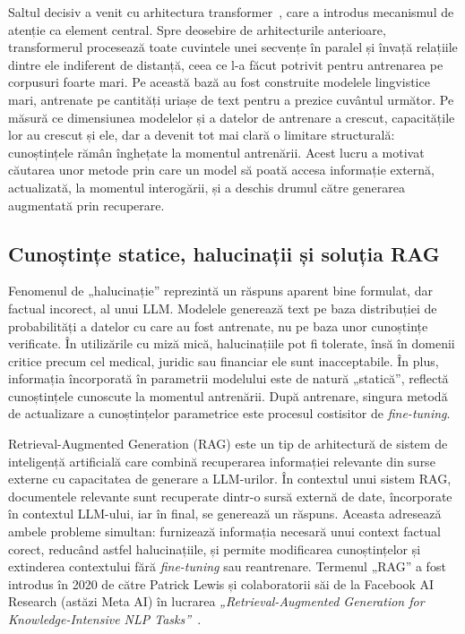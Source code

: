 Saltul decisiv a venit cu arhitectura transformer~\cite{vaswani2017attention}, care a introdus mecanismul de atenție ca element central. Spre deosebire de arhitecturile anterioare, transformerul procesează toate cuvintele unei secvențe în paralel și învață relațiile dintre ele indiferent de distanță, ceea ce l-a făcut potrivit pentru antrenarea pe corpusuri foarte mari. Pe această bază au fost construite modelele lingvistice mari, antrenate pe cantități uriașe de text pentru a prezice cuvântul următor. Pe măsură ce dimensiunea modelelor și a datelor de antrenare a crescut, capacitățile lor au crescut și ele, dar a devenit tot mai clară o limitare structurală: cunoștințele rămân înghețate la momentul antrenării. Acest lucru a motivat căutarea unor metode prin care un model să poată accesa informație externă, actualizată, la momentul interogării, și a deschis drumul către generarea augmentată prin recuperare.

\subsection{Cunoștințe statice, halucinații și soluția RAG}

Fenomenul de „halucinație” reprezintă un răspuns aparent bine formulat, dar factual incorect, al unui LLM. Modelele generează text pe baza distribuției de probabilități a datelor cu care au fost antrenate, nu pe baza unor cunoștințe verificate. În utilizările cu miză mică, halucinațiile pot fi tolerate, însă în domenii critice precum cel medical, juridic sau financiar ele sunt inacceptabile. În plus, informația încorporată în parametrii modelului este de natură „statică”, reflectă cunoștințele cunoscute la momentul antrenării. După antrenare, singura metodă de actualizare a cunoștințelor parametrice este procesul costisitor de \textit{fine-tuning}.

Retrieval-Augmented Generation (RAG) este un tip de arhitectură de sistem de inteligență artificială care combină recuperarea informației relevante din surse externe cu capacitatea de generare a LLM-urilor. În contextul unui sistem RAG, documentele relevante sunt recuperate dintr-o sursă externă de date, încorporate în contextul LLM-ului, iar în final, se generează un răspuns. Aceasta adresează ambele probleme simultan: furnizează informația necesară unui context factual corect, reducând astfel halucinațiile, și permite modificarea cunoștințelor și extinderea contextului fără \textit{fine-tuning} sau reantrenare. Termenul „RAG” a fost introdus în 2020 de către Patrick Lewis și colaboratorii săi de la Facebook AI Research (astăzi Meta AI) în lucrarea \textit{„Retrieval-Augmented Generation for Knowledge-Intensive NLP Tasks”}~\cite{lewis2020rag}.

